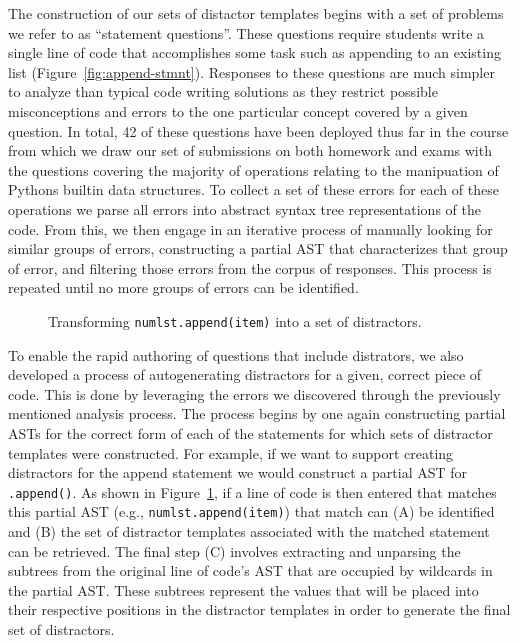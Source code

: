 \documentclass[authorversion,nonacm]{acmart}
\renewcommand{\boxed}[1]{\text{\fboxsep=.2em\fbox{#1}}}
\begin{document}
The construction of our sets of distactor templates begins with a set of
problems we refer to as ``statement questions''. These questions require students
write a single line of code that accomplishes some task such as appending to an
existing list (Figure~\ref{fig:append-stmnt}). Responses to these questions are
much simpler to analyze than typical code writing solutions as they restrict
possible misconceptions and errors to the one particular concept covered by a
given question.  In total, 42 of these questions have been deployed thus far in
the course from which we draw our set of submissions on both homework and exams
with the questions covering the majority of operations relating to the manipuation of 
Pythons builtin data structures. To collect a set of these 
errors for each of these operations we parse all errors into abstract syntax
tree representations of the code. From this, we then engage in an iterative 
process of manually looking for similar groups of errors, constructing a 
partial AST that characterizes that group of error, and filtering those errors
from the corpus of responses. This process is repeated until no more groups of
errors can be identified.  

\begin{figure}[t]
    \centering
    \resizebox{0.5\textwidth}{!}{
        
    }
    \caption{Transforming \texttt{numlst.append(item)} into a set of distractors.}
    \label{fig:appendastmatchesed}
\end{figure}

To enable the rapid authoring of questions that include distrators, we also 
developed a process of autogenerating distractors for a given, correct piece of code.
This is done by leveraging the errors we discovered through the previously
mentioned analysis process.  The process begins by one again constructing
partial ASTs for the correct form of each of the statements for which sets of
distractor templates were constructed.  For example, if we want to support
creating distractors for the append statement we would construct a partial AST
for \texttt{\boxed{1}.append(\boxed{2})}.  As shown in
Figure~\ref{fig:appendastmatchesed}, if a line of code is then entered that
matches this partial AST (e.g., \texttt{numlst.append(item)}) that match can
(A) be identified and (B) the set of distractor templates associated with the
matched statement can be retrieved. The final step (C) involves extracting and
unparsing the subtrees from the original line of code's AST that are occupied
by wildcards in the partial AST. These subtrees represent the values that will
be placed into their respective positions in the distractor templates in order
to generate the final set of distractors.
\end{document}
